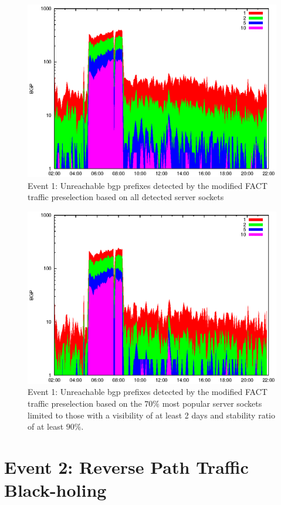 \begin{figure}
	[p] \centering 
	\includegraphics[width=0.75\linewidth]{images/events/2010_03_25/bgp_log_all_external.eps} \caption{Event 1: Unreachable \gls{bgp} prefixes detected by the modified \gls{FACT} traffic preselection based on all detected \glspl{server socket}} 
	\label{fig:AMS_IX_FACT_allSES} 
\end{figure}
\begin{figure}
	[p] \centering 
	\includegraphics[width=0.75\linewidth]{images/events/2010_03_25/bgp_log_Set_var_0_1_stab_9_vts_2.eps} \caption{Event 1: Unreachable \gls{bgp} prefixes detected by the modified \gls{FACT} traffic preselection based on the $70\%$ most popular \glspl{server socket} limited to those with a visibility of at least 2 days and stability ratio of at least $90\%$.} 
	\label{fig:AMS_IX_FACT_popularVTS2STAB9} 
\end{figure}

\newpage 
\section{Event 2: Reverse Path Traffic Black-holing}


